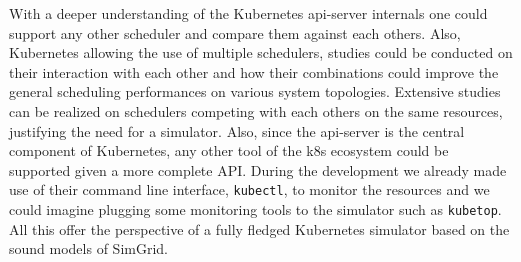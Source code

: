 With a deeper understanding of the Kubernetes api-server internals one could
support any other scheduler and compare them against each others. Also,
Kubernetes allowing the use of multiple schedulers, studies could be conducted
on their interaction with each other and how their combinations could improve
the general scheduling performances on various system topologies. Extensive
studies can be realized on schedulers competing with each others on the same
resources, justifying the need for a simulator. Also, since the api-server is
the central component of Kubernetes, any other tool of the k8s ecosystem could
be supported given a more complete API. During the development we already made
use of their command line interface, \texttt{kubectl}, to monitor the resources
and we could imagine plugging some monitoring tools to the simulator such as
\texttt{kubetop}. All this offer the perspective of a fully fledged Kubernetes
simulator based on the sound models of SimGrid.
